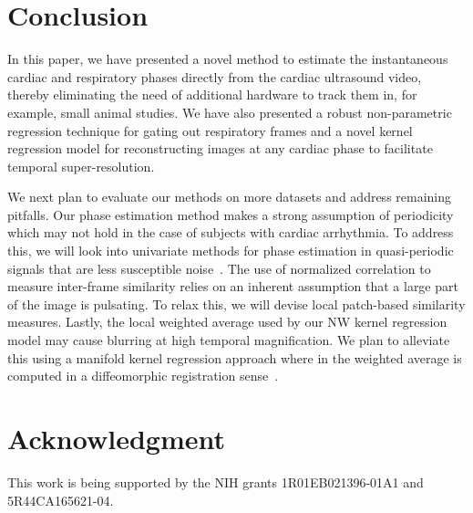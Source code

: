 \documentclass[journal]{IEEEtran}
\begin{document}
\section{Conclusion}
\label{sec:conclusion}
%
In this paper, we have presented a novel method to estimate the instantaneous cardiac and respiratory phases directly from the cardiac ultrasound video, thereby eliminating the need of additional hardware to track them in, for example, small animal studies. We have also presented a robust non-parametric regression technique for gating out respiratory frames and a novel kernel regression model for reconstructing images at any cardiac phase to facilitate temporal super-resolution. 

	We next plan to evaluate our methods on more datasets and address remaining pitfalls. Our phase estimation method makes a strong assumption of periodicity which may not hold in the case of subjects with cardiac arrhythmia. To address this, we will look into univariate methods for phase estimation in quasi-periodic signals that are less susceptible noise~\cite{Luo2003,Lu2013}. The use of normalized correlation to measure inter-frame similarity relies on an inherent assumption that a large part of the image is pulsating. To relax this, we will devise local patch-based similarity measures. Lastly, the local weighted average used by our NW kernel regression model may cause blurring at high temporal magnification. We plan to alleviate this using a manifold kernel regression approach where in the weighted average is computed in a diffeomorphic registration sense~\cite{Davis2010}.
%
%
\section*{Acknowledgment}
This work is being supported by the NIH grants 1R01EB021396-01A1 and 5R44CA165621-04. 
%


%
\end{document}
